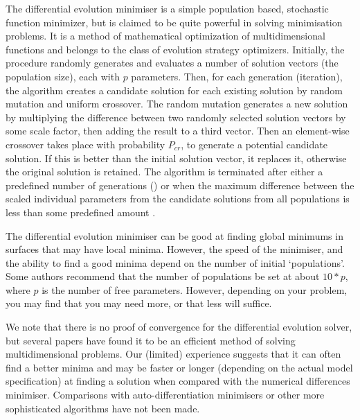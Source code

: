 The differential evolution minimiser is a simple population based, stochastic function minimizer, but is claimed to be quite powerful in solving minimisation problems. It is a method of mathematical optimization of multidimensional functions and belongs to the class of evolution strategy optimizers. Initially, the procedure randomly generates and evaluates a number of solution vectors (the population size), each with $p$ parameters. Then, for each generation (iteration), the algorithm creates a candidate solution for each existing solution by random mutation and uniform crossover. The random mutation generates a new solution by multiplying the difference between two randomly selected solution vectors by some scale factor, then adding the result to a third vector. Then an element-wise crossover takes place with probability $P_{cr}$, to generate a potential candidate solution. If this is better than the initial solution vector, it replaces it, otherwise the original solution is retained. The algorithm is terminated after either a predefined number of generations () or when the maximum difference between the scaled individual parameters from the candidate solutions from all populations is less than some predefined amount .

The differential evolution minimiser can be good at finding global minimums in surfaces that may have local minima. However, the speed of the minimiser, and the ability to find a good minima depend on the number of initial `populations'. Some authors recommend that the number of populations be set at about $10*p$, where $p$ is the number of free parameters. However, depending on your problem, you may find that you may need more, or that less will suffice.

We note that there is no proof of convergence for the differential evolution solver, but several papers have found it to be an efficient method of solving multidimensional problems. Our (limited) experience suggests that it can often find a better minima and may be faster or longer (depending on the actual model specification) at finding a solution when compared with the numerical differences minimiser. Comparisons with auto-differentiation minimisers or other more sophisticated algorithms have not been made. 

\subsection{\label{sec:estimate-profiles}}

